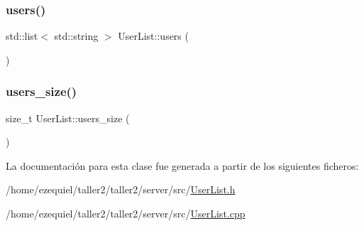\subsubsection{\texorpdfstring{users()}{users()}}
{\footnotesize\ttfamily std\+::list$<$ std\+::string $>$ User\+List\+::users (\begin{DoxyParamCaption}{ }\end{DoxyParamCaption})}

\mbox{\label{classUserList_a4aad4620f110a864907fbf6fc5052ca1}} 
\subsubsection{\texorpdfstring{users\+\_\+size()}{users\_size()}}
{\footnotesize\ttfamily size\+\_\+t User\+List\+::users\+\_\+size (\begin{DoxyParamCaption}{ }\end{DoxyParamCaption})}



La documentación para esta clase fue generada a partir de los siguientes ficheros\+:\begin{DoxyCompactItemize}
\item 
/home/ezequiel/taller2/taller2/server/src/\hyperlink{UserList_8h}{User\+List.\+h}\item 
/home/ezequiel/taller2/taller2/server/src/\hyperlink{UserList_8cpp}{User\+List.\+cpp}\end{DoxyCompactItemize}
